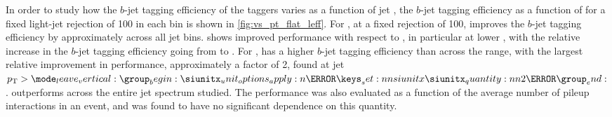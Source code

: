 In order to study how the $b$-jet tagging efficiency of the taggers varies as a function of jet \pt, the $b$-jet tagging efficiency as a function of \pt for a fixed light-jet rejection of 100 in each bin is shown in \cref{fig:vs_pt_flat_leff}.
For \ttbarjets, at a fixed \ljet rejection of 100, \GNN improves the $b$-jet tagging efficiency by approximately  across all jet \pt bins.
\GNNLep shows improved performance with respect to \GNN, in particular at lower \pt, with the relative increase in the $b$-jet tagging efficiency going from  to .
For \Zprimejets, \GNN has a higher $b$-jet tagging efficiency than \DLr across the \pt range, with the largest relative improvement in performance, approximately a factor of 2, found at jet $\pt > \SI{2}{\TeV}$.
\GNN outperforms \DLr across the entire jet \pt spectrum studied. 
The performance was also evaluated as a function of the average number of pileup interactions in an event, and was found to have no significant dependence on this quantity.



